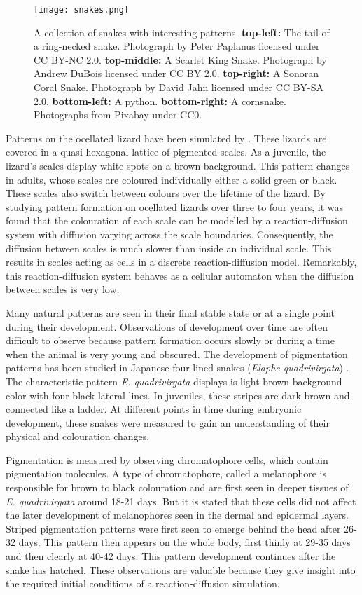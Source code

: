\begin{figure}[hb]
	\centering
	\texttt{[image: snakes.png]}
	\caption{A collection of snakes with interesting patterns. \textbf{top-left:} The tail of a ring-necked snake. Photograph by Peter Paplanus licensed under CC BY-NC 2.0. \textbf{top-middle:} A Scarlet King Snake. Photograph by Andrew DuBois licensed under CC BY 2.0. \textbf{top-right:} A Sonoran Coral Snake. Photograph by David Jahn licensed under CC BY-SA 2.0. \textbf{bottom-left:} A python. \textbf{bottom-right:} A cornsnake. Photographs from Pixabay under CC0.}
	\label{fig:realSnakePatterns}
\end{figure}

Patterns on the ocellated lizard have been simulated by \citep{manukyan2017}. These lizards are covered in a quasi-hexagonal lattice of pigmented scales. As a juvenile, the lizard's scales display white spots on a brown background. This pattern changes in adults, whose scales are coloured individually either a solid green or black. These scales also switch between colours over the lifetime of the lizard. By studying pattern formation on ocellated lizards over three to four years, it was found that the colouration of each scale can be modelled by a reaction-diffusion system with diffusion varying across the scale boundaries. Consequently, the diffusion between scales is much slower than inside an individual scale. This results in scales acting as cells in a discrete reaction-diffusion model. Remarkably, this reaction-diffusion system behaves as a cellular automaton when the diffusion between scales is very low.

Many natural patterns are seen in their final stable state or at a single point during their development. Observations of development over time are often difficult to observe because pattern formation occurs slowly or during a time when the animal is very young and obscured. The development of pigmentation patterns has been studied in Japanese four-lined snakes (\textit{Elaphe quadrivirgata}) \citep{murakami2018}. The characteristic pattern \textit{E. quadrivirgata} displays is light brown background color with four black lateral lines. In juveniles, these stripes are dark brown and connected like a ladder. At different points in time during embryonic development, these snakes were measured to gain an understanding of their physical and colouration changes.
 
Pigmentation is measured by observing chromatophore cells, which contain pigmentation molecules. A type of chromatophore, called a melanophore is responsible for brown to black colouration and are first seen in deeper tissues of \textit{E. quadrivirgata} around 18-21 days. But it is stated that these cells did not affect the later development of melanophores seen in the dermal and epidermal layers. Striped pigmentation patterns were first seen to emerge behind the head after 26-32 days. This pattern then appears on the whole body, first thinly at 29-35 days and then clearly at 40-42 days. This pattern development continues after the snake has hatched. These observations are valuable because they give insight into the required initial conditions of a reaction-diffusion simulation.

